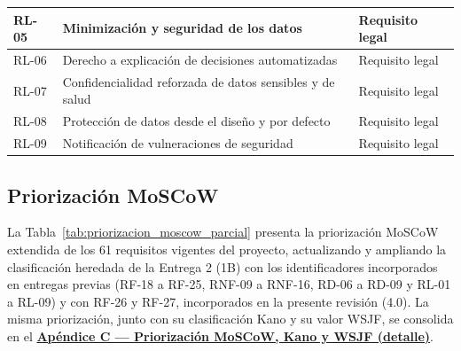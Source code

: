 \documentclass[journal,onecolumn]{IEEEtran}
\begin{document}
\begin{longtable}{@{}p{2.2cm} p{7.5cm} p{3.5cm}@{}}
		\hline
		RL-05 & Minimización y seguridad de los datos & Requisito legal \\
		\hline
		RL-06 & Derecho a explicación de decisiones automatizadas & Requisito legal \\
		\hline
		RL-07 & Confidencialidad reforzada de datos sensibles y de salud & Requisito legal \\
		\hline
		RL-08 & Protección de datos desde el diseño y por defecto & Requisito legal \\
		\hline
		RL-09 & Notificación de vulneraciones de seguridad & Requisito legal \\
	\end{longtable}
	
	\newpage
	
	\subsection{Priorización MoSCoW}
	\label{sec:moscow}
	
	La Tabla~\ref{tab:priorizacion_moscow_parcial} presenta la priorización
	MoSCoW extendida de los 61 requisitos vigentes del proyecto, actualizando y
	ampliando la clasificación heredada de la Entrega 2 (1B) con los
	identificadores incorporados en entregas previas (RF-18 a RF-25, RNF-09 a
	RNF-16, RD-06 a RD-09 y RL-01 a RL-09) y con RF-26 y RF-27, incorporados en
	la presente revisión (4.0). La misma priorización, junto con su
	clasificación Kano y su valor WSJF, se consolida en el
	\textbf{\hyperref[tab:priorizacion_moscow_completa]{Apéndice C --- Priorización
			MoSCoW, Kano y WSJF (detalle)}}.
	
\end{document}
